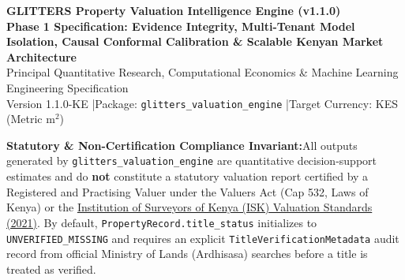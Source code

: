 \documentclass[11pt,a4paper]{article}
\newcommand{\takeaway}[2]{%
  \vspace{6pt}\noindent\colorbox{primary!8}{%
    \parbox{\dimexpr\linewidth-2\fboxsep\relax}{%
      \vspace{3pt}\textbf{\color{primary}#1:}\hspace{0.5em}#2\vspace{3pt}%
    }%
  }\vspace{6pt}%
}
\begin{document}
\begin{center}
    {\LARGE \textbf{\color{primary}GLITTERS Property Valuation Intelligence Engine (v1.1.0)}}\\[6pt]
    {\large \textbf{Phase 1 Specification: Evidence Integrity, Multi-Tenant Model Isolation, Causal Conformal Calibration \& Scalable Kenyan Market Architecture}}\\[8pt]
    {\normalsize Principal Quantitative Research, Computational Economics \& Machine Learning Engineering Specification}\\
    {\small Version 1.1.0-KE \quad|\quad Package: \texttt{glitters\_valuation\_engine} \quad|\quad Target Currency: KES (Metric $\text{m}^2$)}
\end{center}

\vspace{4pt}
\begin{abstract}
\noindent This specification defines the mathematical foundations, econometric estimators, spatial stochastic processes, machine learning ensembles, uncertainty quantification protocols, and production integration architecture for \textbf{GLITTERS Valuation Engine v1.1.0} (\texttt{glitters\_valuation\_engine}), incorporating all **Phase 1: Evidence Integrity \& Statistical Correctness** audit remediations. Designed for Kenya's property markets across all 47 counties, the engine unifies seven valuation paradigms while enforcing five critical mathematical and engineering invariants: (1) strict segregation of capital sale evidence from rental cash-flow observations; (2) immutable SHA-256 model training provenance that blocks synthetic data from production training by default and propagates synthetic provenance into every inference output; (3) model-level multi-tenant scope binding (\texttt{PUBLIC\_REGISTRY\_ONLY}, \texttt{SINGLE\_TENANT\_PRIVATE}, \texttt{AUTHORIZED\_POOLED}) preventing cross-tenant weight leakage; (4) exact finite-sample order-statistic conformal calibration $k = \lceil (n_{\text{cal}} + 1)(1 - \alpha) \rceil$ requiring $n_{\text{cal}} \ge \lceil (1 - \alpha)/\alpha \rceil$ coupled with locally weighted KNN conformal scaling; and (5) global chronological sorting prior to locality MAD outlier screening and strictly causal historical reference filtering ($t_{\text{comp}} \le t_{\text{val}}$) with zero temporal lookahead leakage.
\end{abstract}

\takeaway{Statutory \& Non-Certification Compliance Invariant}{All outputs generated by \texttt{glitters\_valuation\_engine} are quantitative decision-support estimates and do \textbf{not} constitute a statutory valuation report certified by a Registered and Practising Valuer under the Valuers Act (Cap 532, Laws of Kenya) or the \href{https://isk.or.ke/membership/members-chapter/}{Institution of Surveyors of Kenya (ISK) Valuation Standards (2021)}. By default, \texttt{PropertyRecord.title\_status} initializes to \texttt{UNVERIFIED\_MISSING} and requires an explicit \texttt{TitleVerificationMetadata} audit record from official Ministry of Lands (Ardhisasa) searches before a title is treated as verified.}
\end{document}
